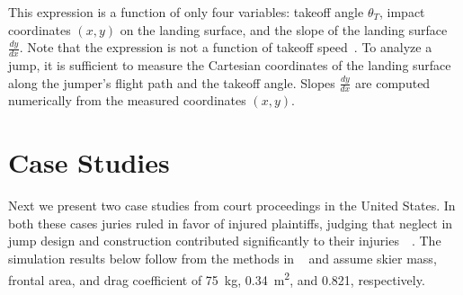 \documentclass{article}
\begin{document}
This expression is  a function of only four variables: takeoff angle
$\theta_T$, impact coordinates $(x,y)$ on the landing surface, and the slope of
the landing surface $\frac{dy}{dx}$. Note that the expression
is not a function of takeoff speed~\cite{Petrone2017}. To analyze a jump,
it is sufficient to measure the Cartesian coordinates of the landing surface
along the jumper's flight path and the takeoff angle. Slopes $\frac{dy}{dx}$
are computed numerically from the measured coordinates $(x,y)$.

\section{Case Studies}
%
Next we present two case studies from court proceedings in the United States.
In both these cases juries ruled in favor of injured plaintiffs, judging that
neglect in jump design and construction contributed significantly to their
injuries~\cite{Alvarado2002}~\cite{Salvini2008}. The simulation results below follow from the methods in
~\cite{Levy2015} and assume skier mass, frontal area, and drag coefficient of
75~\si{\kg}, 0.34~\si{\meter\squared}, and 0.821, respectively.
\end{document}
